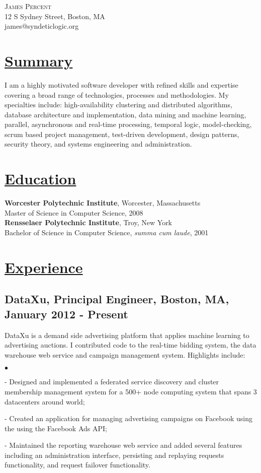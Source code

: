 \documentclass[8pt]{article}
\newenvironment{achievements}{\begin{list}{$\bullet$}{\topsep 0pt \itemsep -2pt}}{\vspace*{2pt}\end{list}}
\begin{document}
\begin{center}{\Large \scshape James Percent}\\
12 S Sydney Street, Boston, MA\\
james@syndeticlogic.org
\end{center}
\section*{\underline {Summary}}

I am a highly motivated software developer with refined skills and expertise covering a broad range of technologies, 
processes and methodologies.  My specialties include: high-availability clustering and distributed algorithms, database
architecture and implementation, data mining and machine learning,
parallel, asynchronous and real-time processing, temporal logic,
model-checking, scrum based project management, test-driven
development, design patterns, security theory, and systems engineering
and administration.\\

\section*{\underline {Education}}
\textbf{Worcester Polytechnic Institute}, Worcester, Massachusetts\\
Master of Science in Computer Science, 2008\\
\vspace*{7pt}
\textbf{Rensselaer Polytechnic Institute}, Troy, New York\\
Bachelor of Science in Computer Science, \textit{summa cum laude}, 2001

\section*{\underline{Experience}}

\subsection*{\normalsize DataXu, Principal Engineer, Boston, MA, January 2012 - Present}

DataXu is a demand side advertising platform that applies machine
learning to advertising auctions.  I contributed code to the real-time
bidding system, the data warehouse web service and
campaign management system.  Highlights include:

\begin{achievements}
\item[-] Designed and implemented a federated service discovery and
  cluster membership management system for a 500+ node computing system that spans 3
  datacenters around world;
\item[-] Created an application for managing advertising campaigns on
  Facebook using the using the Facebook Ads API;
\item[-] Maintained the reporting warehouse web service and added several features including an administration interface, persisting and replaying requests functionality, and request failover functionality.
\end{achievements}
\end{document}
